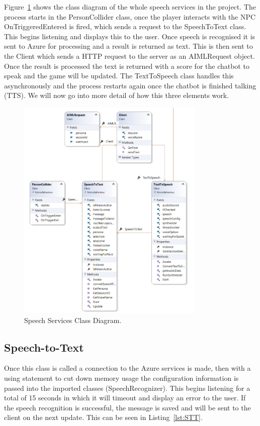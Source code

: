\par
\medskip

Figure~\ref{image:SpeechServices} shows the class diagram of the whole speech services in the project. The process starts in the PersonCollider class, once the player interacts with the NPC OnTriggeredEntered is fired, which sends a request to the SpeechToText class. This begins listening and displays this to the user. Once speech is recognised it is sent to Azure for processing and a result is returned as text. This is then sent to the Client which sends a HTTP request to the server as an AIMLRequest object. Once the result is processed the text is returned with a score for the chatbot to speak and the game will be updated. The TextToSpeech class handles this asynchronously and the process restarts again once the chatbot is finished talking (TTS). We will now go into more detail of how this three elements work.

\begin{figure}[h!]
	\caption{Speech Services Class Diagram.}
	\label{image:SpeechServices}
	\centering
	\includegraphics[width=0.8\textwidth]{Images/ClassDiagram STT and TTS.png}
\end{figure}

\subsection{Speech-to-Text}
Once this class is called a connection to the Azure services is made, then with a using statement to cut down memory usage the configuration information is passed into the imported classes (SpeechRecognizer). This begins listening for a total of 15 seconds in which it will timeout and display an error to the user. If the speech recognition is successful, the message is saved and will be sent to the client on the next update. This can be seen in Listing~\ref{lst:STT}.

